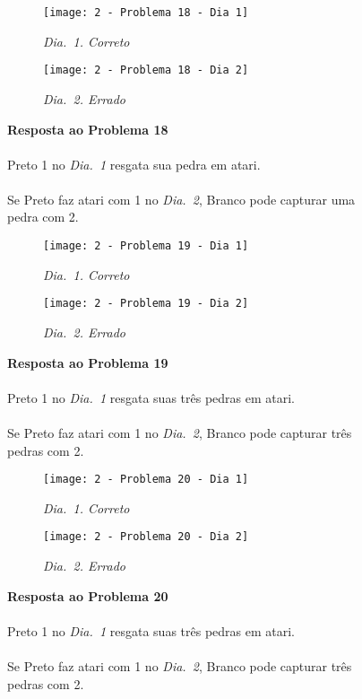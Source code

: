 \vfill

\begin{SCfigure}[][h!]
    \begin{subfigure}[t]{.31\textwidth}
        \texttt{[image: 2 - Problema 18 - Dia 1]}
        \caption*{\emph{Dia.\@~1. Correto}}
    \end{subfigure}
    \hfill
    \begin{subfigure}[t]{.31\textwidth}
        \texttt{[image: 2 - Problema 18 - Dia 2]}
        \caption*{\emph{Dia.\@~2. Errado}}
    \end{subfigure}
    \hfill
    \caption*{\textbf{Resposta ao Problema 18}\\\\Preto 1 no \emph{Dia.\@~1} resgata sua pedra em atari.\\\\Se Preto faz atari com 1 no \emph{Dia.\@~2}, Branco pode capturar uma pedra com 2.}
\end{SCfigure}

\pagebreak

\begin{SCfigure}[][h!]
    \begin{subfigure}[t]{.31\textwidth}
        \texttt{[image: 2 - Problema 19 - Dia 1]}
        \caption*{\emph{Dia.\@~1. Correto}}
    \end{subfigure}
    \hfill
    \begin{subfigure}[t]{.31\textwidth}
        \texttt{[image: 2 - Problema 19 - Dia 2]}
        \caption*{\emph{Dia.\@~2. Errado}}
    \end{subfigure}
    \hfill
    \caption*{\textbf{Resposta ao Problema 19}\\\\Preto 1 no \emph{Dia.\@~1} resgata suas três pedras em atari.\\\\Se Preto faz atari com 1 no \emph{Dia.\@~2}, Branco pode capturar três pedras com 2.}
\end{SCfigure}

\vfill

\begin{SCfigure}[][h!]
    \begin{subfigure}[t]{.31\textwidth}
        \texttt{[image: 2 - Problema 20 - Dia 1]}
        \caption*{\emph{Dia.\@~1. Correto}}
    \end{subfigure}
    \hfill
    \begin{subfigure}[t]{.31\textwidth}
        \texttt{[image: 2 - Problema 20 - Dia 2]}
        \caption*{\emph{Dia.\@~2. Errado}}
    \end{subfigure}
    \hfill
    \caption*{\textbf{Resposta ao Problema 20}\\\\Preto 1 no \emph{Dia.\@~1} resgata suas três pedras em atari.\\\\Se Preto faz atari com 1 no \emph{Dia.\@~2}, Branco pode capturar três pedras com 2.}
\end{SCfigure}

